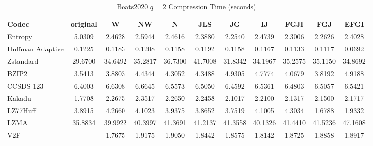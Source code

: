 \documentclass{article}
\begin{document}
\begin{table}[h!]
\centering
\caption{Boats2020 $q=2$ Compression Time (seconds)}
\begin{tabular}{|l|cccccccccc|}
\hline
Codec &  original &       W &      NW &       N &     JLS &      JG &      IJ &    FGJI &     FGJ &    EFGI \\
\hline
Entropy & 5.0309 & 2.4628 & 2.5944 & 2.4616 & 2.3880 & 2.2540 & 2.4739 & 2.3006 & 2.2626 & 2.4028         \\
\hline
Huffman Adaptive &    0.1225 &  0.1183 &  0.1208 &  0.1158 &  0.1192 &  0.1158 &  0.1167 &  0.1133 &  0.1117 &  0.0692 \\
Zstandard        &   29.6700 & 34.6492 & 35.2817 & 36.7300 & 41.7008 & 31.8342 & 34.1967 & 35.2575 & 35.1150 & 34.8692 \\
BZIP2            &    3.5413 &  3.8803 &  4.4344 &  4.3052 &  4.3488 &  4.9305 &  4.7774 &  4.0679 &  3.8192 &  4.9188 \\
CCSDS 123        &    6.4003 &  6.6308 &  6.6645 &  6.5573 &  6.5050 &  6.4592 &  6.5361 &  6.4803 &  6.5057 &  6.5421 \\
Kakadu           &    1.7708 &  2.2675 &  2.3517 &  2.2650 &  2.2458 &  2.1017 &  2.2100 &  2.1317 &  2.1500 &  2.1717 \\
LZ77Huff         &    3.8915 &  4.2660 &  4.1023 &  3.9375 &  3.8652 &  3.7519 &  4.1005 &  4.3034 &  1.6788 &  1.9332 \\
LZMA             &   35.8834 & 39.9922 & 40.3997 & 41.3691 & 41.2137 & 41.3558 & 40.1326 & 41.4410 & 41.5236 & 47.1608 \\
V2F              &    - &  1.7675 &  1.9175 &  1.9050 &  1.8442 &  1.8575 &  1.8142 &  1.8725 &  1.8858 &  1.8917 \\
\hline
\end{tabular}
\end{table}

\newpage
\end{document}
